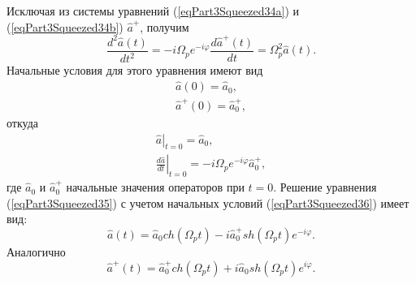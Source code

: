 Исключая из системы уравнений (\ref{eqPart3Squeezed34a}) и
(\ref{eqPart3Squeezed34b}) $\hat{a}^{+}$, получим
\begin{equation}
\frac{d^2\hat{a}\left(t\right)}{dt^2} = 
- i \Omega_p e^{- i \varphi}
\frac{d\hat{a}^{+}\left(t\right)}{dt} = 
\Omega_p^2\hat{a}\left(t\right).
\label{eqPart3Squeezed35}
\end{equation}
Начальные условия для этого уравнения имеют вид
\begin{eqnarray}
\hat{a}\left(0\right) = \hat{a}_0, 
\nonumber \\
\hat{a}^{+}\left(0\right) = \hat{a}^{+}_0, 
\nonumber
\end{eqnarray}
откуда
\begin{eqnarray}
\left.\hat{a}\right|_{t=0} = \hat{a}_0, 
\nonumber \\
\left.\frac{d\hat{a}}{dt}\right|_{t=0} = 
- i \Omega_p e^{- i \varphi} \hat{a}^{+}_0,
\label{eqPart3Squeezed36}
\end{eqnarray}
где $\hat{a}_0$ и $\hat{a}^{+}_0$ начальные значения операторов при $t
= 0$. Решение уравнения (\ref{eqPart3Squeezed35}) с учетом начальных
условий (\ref{eqPart3Squeezed36}) имеет вид:
\begin{equation}
\hat{a}\left(t\right) = \hat{a}_0 ch \left(\Omega_p t \right) - 
i \hat{a}^{+}_0 sh \left(\Omega_p t\right) e^{-i \varphi}.
\label{eqPart3Squeezed37a}
\end{equation}
Аналогично
\begin{equation}
\hat{a}^{+}\left(t\right) = \hat{a}^{+}_0 ch \left(\Omega_p t \right) +
i \hat{a}_0 sh \left(\Omega_p t\right) e^{i \varphi}.
\label{eqPart3Squeezed37b}
\end{equation}



